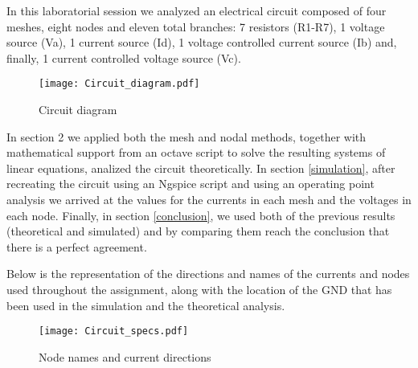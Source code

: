 \hspace{12pt} In this laboratorial session we analyzed an electrical circuit composed of four meshes, eight nodes and eleven total branches: 7 resistors (R1-R7), 1 voltage source (Va), 1 current source (Id), 1 voltage controlled current source (Ib) and, finally, 1 current controlled voltage source (Vc).

\begin{figure}[h]
	\centering
	\texttt{[image: Circuit\_diagram.pdf]}
	\caption{Circuit diagram}
	\label{fig:circuit}
\end{figure}

In section 2 we applied both the mesh and nodal methods, together with mathematical support from an octave script to solve the resulting systems of linear equations, analized the circuit theoretically. In section \ref{simulation}, after recreating the circuit using an Ngspice script and using an operating point analysis we arrived at the values for the currents in each mesh and the voltages in each node. 
Finally, in section \ref{conclusion}, we used both of the previous results (theoretical and simulated) and by comparing them reach the conclusion that there is a perfect agreement.

Below is the representation of the directions and names of the currents and nodes used throughout the assignment, along with the location of the GND that has been used in the simulation and the theoretical analysis.
\begin{figure}[h]
	\centering
	\texttt{[image: Circuit\_specs.pdf]}
	\caption{Node names and current directions}
	\label{fig:circuit_spec}
\end{figure}

\pagebreak
